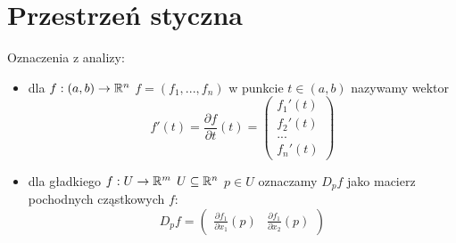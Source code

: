 \section{Przestrzeń styczna}

\begin{bbox}
  Oznaczenia z analizy:

  \begin{itemize}
    \item[\PHtunny] dla $f:(a, b)\to \mathbb{R}^n$ $f=(f_1,...,f_n)$  w punkcie $t\in (a, b)$ nazywamy wektor 
      $$f'(t)=\frac{\partial f}{\partial t}(t)=\begin{pmatrix}f_1'(t)\\f_2'(t)\\...\\f_n'(t)\end{pmatrix}$$
    \item[\PHtunny] dla gładkiego $f:U\to\mathbb{R}^m$ $U\subseteq\mathbb{R}^n$ $p\in U$ oznaczamy $D_pf$ jako macierz pochodnych cząstkowych $f$:
      $$D_pf=\begin{pmatrix}\frac{\partial f_1}{\partial x_1}(p) & \frac{\partial f_1}{\partial x_2}(p)\end{pmatrix}$$
  \end{itemize}
\end{bbox}
